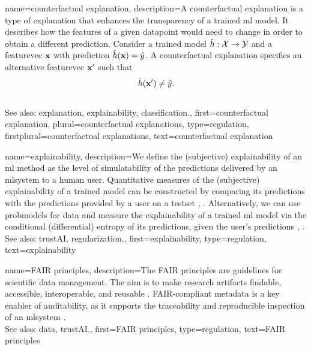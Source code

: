 {name={counterfactual explanation},
	description={A counterfactual \gls{explanation} 
		is a type of \gls{explanation} that enhances the \gls{transparency} 
		of a trained \gls{ml} \gls{model}. It describes how the \glspl{feature} 
		of a given \gls{datapoint} would need to change in order to obtain 
		a different \gls{prediction}. Consider a trained \gls{model} 
		$\hat{h}:\mathcal{X} \rightarrow\mathcal{Y}$ and a 
		\gls{featurevec} ${\bf x}$ with \gls{prediction} $\hat{h}({\bf x})=\hat{y}$. 
		A counterfactual \gls{explanation} specifies an alternative 
		\gls{featurevec} ${\bf x}'$ such that
		$$\hat{h}({\bf x}')  \neq \hat{y}.$$
		\\
		See also: \gls{explanation}, \gls{explainability}, \gls{classification}.},
	first={counterfactual explanation},
	plural={counterfactual explanations},
	type=regulation,
	firstplural={counterfactual explanations},
	text={counterfactual explanation}
}

{name={explainability},
	description={We define the (subjective) explainability of an \gls{ml} method 
		as the level of simulatability \cite{Colin:2022aa} of the \glspl{prediction} 
		delivered by an \gls{mlsystem} to a human user. Quantitative \glspl{measure} of the 
		(subjective) explainability of a trained \gls{model} can be constructed by 
		comparing its \glspl{prediction} with the \glspl{prediction} provided by a user 
		on a \gls{testset} \cite{Colin:2022aa}, \cite{Zhang:2024aa}. Alternatively, we can use 
		\glspl{probmodel} for \gls{data} and measure the explainability of a trained \gls{ml} 
		\gls{model} via the conditional (differential) \gls{entropy} of its \glspl{prediction}, given the 
		user's \glspl{prediction} \cite{JunXML2020}, \cite{Chen2018}.
						\\ 
		See also: \gls{trustAI}, \gls{regularization}.},
	first={explainability},
	type=regulation,
	text={explainability}
}

{name={FAIR principles},
	description={The FAIR principles are guidelines for 
		scientific \gls{data} management. The aim is to make research 
		artifacts findable, accessible, interoperable, and reusable \cite{Wilkinson:2016aa}.
		FAIR-compliant metadata is a key enabler of auditability, as it 
		supports the traceability and reproducible inspection of an \gls{mlsystem} \cite{Samuel2020}. 
		\\
		See also: \gls{data}, \gls{trustAI}.},
	first={FAIR principles},
	type=regulation, 
	text={FAIR principles}
}

